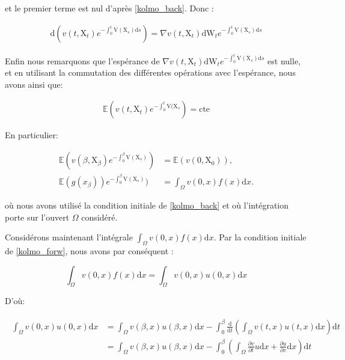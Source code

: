 \documentclass[11pt]{article}
\theoremstyle{definition}
\theoremstyle{remark}
\begin{document}
et le premier terme est nul d'après \eqref{kolmo_back}. Donc :

\begin{align}
\mathrm{d}(v(t, \mathrm{X}_{t}) e^{-\int_0^{t} \mathrm{V}(\mathrm{X}_{s}) \mathrm{d}s}) = \nabla v(t, \mathrm{X}_t)\mathrm{dW}_{t} e^{-\int_0^{t} \mathrm{V}(\mathrm{X}_{s}) \mathrm{d}s}
\end{align}

Enfin nous remarquons que l’espérance de $\nabla v(t, \mathrm{X}_t)\mathrm{dW}_{t} e^{-\int_0^{t} \mathrm{V}(\mathrm{X}_{s}) \mathrm{d}s}$ est nulle, et en utilisant la commutation des différentes opérations avec l’espérance, nous avons ainsi que: 

\begin{align}
\mathbb{E}(v(t , \mathrm{X}_{t})e^{-\int_0^{t} \mathrm{V}(\mathrm{X}_{s}}) = \mathrm{cte}
\end{align}

En particulier:

\begin{align}
\mathbb{E}(v(\beta , \mathrm{X}_{\beta})e^{-\int_0^{\beta} \mathrm{V}(\mathrm{X}_{s})}) &= \mathbb{E}(v(0, \mathrm{X}_0)), \\
\mathbb{E}(g(x_{\beta}))e^{-\int_0^{\beta} \mathrm{V}(\mathrm{X}_{s})}) &= \int_{\Omega} v(0,x) f(x) \mathrm{d}x.
\end{align}

où nous avons utilisé la condition initiale de \eqref{kolmo_back} et où l’intégration porte sur l'ouvert $\Omega$ considéré. 

Considérons maintenant l'intégrale $\int_{\Omega} v(0,x) f(x) \mathrm{d}x$. Par la condition initiale de \eqref{kolmo_forw}, nous avons par conséquent :

\begin{equation}
\int_{\Omega} v(0,x) f(x) \mathrm{d}x = \int_{\Omega} v(0,x) u(0,x) \mathrm{d}x
\end{equation}

D'où:

\begin{align}
\label{expansion_integral_vu}
\begin{split}
\int_{\Omega} v(0,x) u(0,x) \mathrm{d}x &= \int_{\Omega} v(\beta, x) u(\beta,x) \mathrm{d}x - \int_{0}^{\beta} \frac{\mathrm{d}}{\mathrm{d}t}\left(\int_{\Omega} v(t,x) u(t,x) \mathrm{d}x \right) \mathrm{d}t \\
&= \int_{\Omega} v(\beta, x) u(\beta,x) \mathrm{d}x - \int_{0}^{\beta} \left( \int_{\Omega} \frac{\partial v}{\partial t} u \mathrm{d}x + \frac{\partial u}{\partial v} \mathrm{d}x \right) \mathrm{d}t
\end{split}
\end{align}
\end{document}

